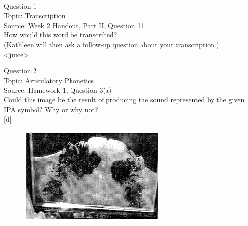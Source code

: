 \documentclass[12pt]{article}
\begin{document}
\newpage

\begin{center}
\textbf{{\color{red}{\HUGE END OF EXAM}}}\\

\end{center}
\newpage

\begin{center}
\textbf{{\color{blue}{\HUGE START OF EXAM\\}}}

\textbf{{\color{blue}{\HUGE Student ID: 74752\\}}}

\textbf{{\color{blue}{\HUGE \\}}}

\end{center}
\newpage

{\large Question 1}\\

Topic: Transcription\\
Source: Week 2 Handout, Part II, Question 11\\

How would this word be transcribed?\\ (Kathleen will then ask a follow-up question about your transcription.)\\

<juice>


\newpage

{\large Question 2}\\

Topic: Articulatory Phonetics\\
Source: Homework 1, Question 3(a)\\

Could this image be the result of producing the sound represented by the given IPA symbol? Why or why not?\\

{[d]}

\begin{figure}[H]
\includegraphics{../images/staticpalatography_fricative.png}
\end{figure}
\end{document}
